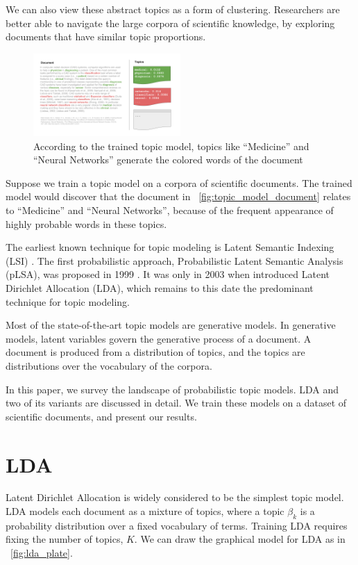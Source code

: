 \documentclass[letterpaper]{article}
\begin{document}
We can also view these abstract topics as a form of clustering.
Researchers are better able to navigate the large corpora of
scientific knowledge, by exploring documents that have similar topic
proportions.

\begin{figure}[ht]
  \centering
  \includegraphics[width=0.5\textwidth]{topic_models.png}
  \caption{\label{fig:topic_model_document} According to the trained
    topic model, topics like ``Medicine'' and ``Neural Networks''
    generate the colored words of the document}
\end{figure}

Suppose we train a topic model on a corpora of scientific documents.
The trained model would discover that the document in
~\autoref{fig:topic_model_document} relates to ``Medicine'' and
``Neural Networks'', because of the frequent appearance of highly
probable words in these topics.

The earliest known technique for topic modeling is Latent Semantic
Indexing (LSI) \cite{deerwester1990indexing}. The first probabilistic
approach, Probabilistic Latent Semantic Analysis (pLSA), was proposed
in 1999 \cite{hofmann1999probabilistic}. It was only in 2003 when
\citeauthor{blei2003latent} introduced Latent Dirichlet Allocation
(LDA), which remains to this date the predominant technique for topic
modeling.

Most of the state-of-the-art topic models are generative models. In
generative models, latent variables govern the generative process of a
document. A document is produced from a distribution of topics, and
the topics are distributions over the vocabulary of the corpora.

In this paper, we survey the landscape of probabilistic topic models.
LDA and two of its variants are discussed in detail. We train these
models on a dataset of scientific documents, and present our results.

\section{LDA}
Latent Dirichlet Allocation is widely considered to be the simplest
topic model. LDA models each document as a mixture of topics, where a
topic $\beta_k$ is a probability distribution over a fixed vocabulary
of terms. Training LDA requires fixing the number of topics, $K$.
We can draw the graphical model for LDA as in
~\autoref{fig:lda_plate}.
\end{document}

